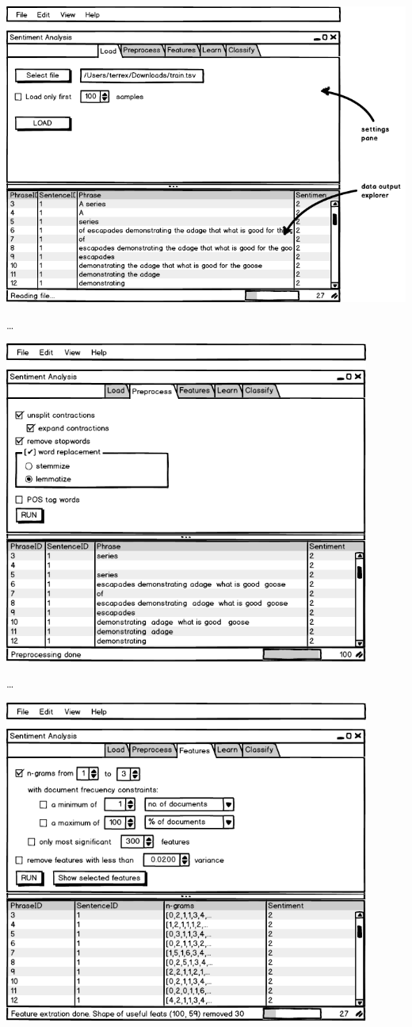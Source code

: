 \includegraphics[width=14cm]{gui-1-load}

\ldots

\includegraphics[width=12cm]{gui-2-preprocess}

\ldots

\includegraphics[width=12cm]{gui-3-features}

